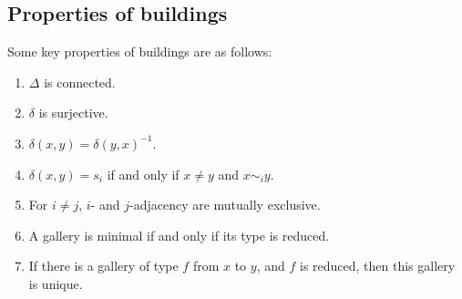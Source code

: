 \documentclass[11pt]{article}
\begin{document}
\subsection{Properties of buildings}
Some key properties of buildings are as follows:
\begin{enumerate}
    \item $\Delta$ is connected.
    \item $\delta$ is surjective.
    \item $\delta(x,y)=\delta(y,x)^{-1}$.
    \item $\delta(x,y)=s_i$ if and only if $x\neq y$ and $x\sim_i y$.
    \item For $i\neq j$, $i$- and $j$-adjacency are mutually exclusive.
    \item A gallery is minimal if and only if its type is reduced.
    \item If there is a gallery of type $f$ from $x$ to $y$, and $f$ is reduced, then this gallery is unique.
\end{enumerate}






\end{document}
